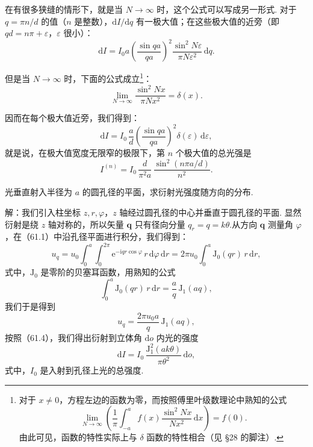 \begin{xiti}
在有很多狭缝的情形下，就是当 $N\to\infty$ 时，这个公式可以写成另一形式. 对于 $q=\pi n/d$ 的值（$n$ 是整数），$\mathrm{d}I/\mathrm{d}q$ 有一极大值；在这些极大值的近旁（即 $qd=n\pi+\varepsilon$，$\varepsilon$ 很小）：
\begin{equation*}
  \mathrm{d}I=I_0a\left(\frac{\sin qa}{qa}\right)^2
  \frac{\sin^2 N\varepsilon}{\pi N\varepsilon^2}\,\mathrm{d}q.
\end{equation*}

但是当 $N\to\infty$ 时，下面的公式成立\footnote{对于 $x\neq 0$，方程左边的函数为零，而按照傅里叶级数理论中熟知的公式
\begin{equation*}
  \lim_{N\to\infty}\left(\frac{1}{\pi}\int_{-a}^{a}f(x)\frac{\sin^2 Nx}{Nx^2}\,\mathrm{d}x\right)=f(0).
\end{equation*}
由此可见，函数的特性实际上与 $\delta$ 函数的特性相合（见 §28 的脚注）.}：
\begin{equation*}
  \lim_{N\to\infty}\frac{\sin^2 Nx}{\pi Nx^2}=\delta(x).
\end{equation*}


因而在每个极大值近旁，我们得到：
\begin{equation*}
  \mathrm{d}I=I_0\,\frac{a}{d}\left(\frac{\sin qa}{qa}\right)^2
  \delta(\varepsilon)\,\mathrm{d}\varepsilon,
\end{equation*}
就是说，在极大值宽度无限窄的极限下，第 $n$ 个极大值的总光强是
\begin{equation*}
  I^{(n)}=I_0\,\frac{d}{\pi^2 a}\,
  \frac{\sin^2(n\pi a/d)}{n^2}.
\end{equation*}

\quad 光垂直射入半径为 $a$ 的圆孔径的平面，求衍射光强度随方向的分布.

解：我们引入柱坐标 $z,r,\varphi$，$z$ 轴经过圆孔径的中心并垂直于圆孔径的平面. 显然衍射是绕 $z$ 轴对称的，所以矢量 $\boldsymbol{q}$ 只有径向分量 $q_r=q=k\theta$.从方向 $\boldsymbol{q}$ 测量角 $\varphi$，在（61.1）中沿孔径平面进行积分，我们得到：
\begin{equation*}
  u_q=u_0\int_0^{a}\int_0^{2\pi}
  \mathrm{e}^{-\mathrm{i}qr\cos\varphi}\,r\,\mathrm{d}\varphi\,\mathrm{d}r
  =2\pi u_0\int_0^{a}\mathrm{J}_0(qr)\,r\,\mathrm{d}r,
\end{equation*}
式中，$\mathrm{J}_0$ 是零阶的贝塞耳函数，用熟知的公式
\begin{equation*}
  \int_0^{a}\mathrm{J}_0(qr)\,r\,\mathrm{d}r
  =\frac{a}{q}\,\mathrm{J}_1(aq),
\end{equation*}
我们于是得到
\begin{equation*}
  u_q=\frac{2\pi u_0a}{q}\,\mathrm{J}_1(aq),
\end{equation*}
按照（61.4），我们得出衍射到立体角 $\mathrm{d}o$ 内光的强度
\begin{equation*}
  \mathrm{d}I=I_0\,\frac{\mathrm{J}_1^2(ak\theta)}{\pi\theta^2}\,\mathrm{d}o,
\end{equation*}
式中，$I_0$ 是入射到孔径上光的总强度.

\end{xiti}
